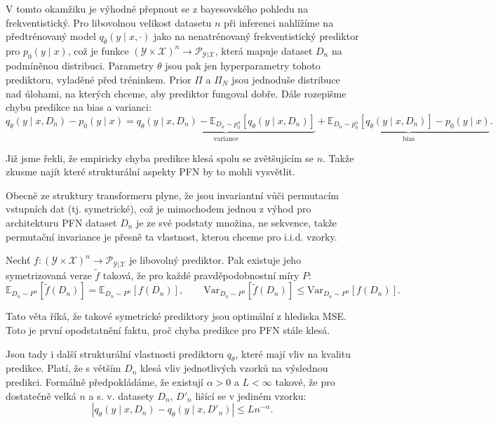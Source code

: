 V tomto okamžiku je výhodné přepnout se z bayesovského pohledu na frekventistický.
Pro libovolnou velikost datasetu $n$ při inferenci nahlížíme na předtrénovaný model $q_{\hat\theta}(y \mid x, \cdot)$ jako na nenatrénovaný frekventistický prediktor pro $p_0(y \mid x)$, což je funkce $(\mathcal{Y} \times \mathcal{X})^n \to \mathcal{P}_{\mathcal{Y}|\mathcal{X}}$, která mapuje dataset $D_n$ na podmíněnou distribuci.
Parametry $\theta$ jsou pak jen hyperparametry tohoto prediktoru, vyladěné před tréninkem. 
Prior $\Pi$ a $\Pi_N$ jsou jednoduše distribuce nad úlohami, na kterých chceme, aby prediktor fungoval dobře.
Dále rozepišme chybu predikce na bias a varianci:
\begin{equation}
    q_\theta(y \mid x, D_n) - p_0(y \mid x) = \underbrace{q_\theta(y \mid x, D_n) - \mathbb{E}_{D_n \sim p_0^n}[q_\theta(y \mid x, D_n)]}_{\text{variance}} + \underbrace{\mathbb{E}_{D_n \sim p_0^n}[q_\theta(y \mid x, D_n)] - p_0(y \mid x)}_{\text{bias}}.
\label{Bias_Variance}
\end{equation}

Již jsme řekli, že empiricky chyba predikce klesá spolu se zvětšujícím se $n$.
Takže zkusme najít které strukturální aspekty PFN by to mohli vysvětlit.
\par 

Obecně ze struktury transformeru plyne, že jsou invariantní vůči permutacím vstupních dat (tj. symetrické), což je mimochodem jednou z výhod pro architekturu PFN dataset $D_n$ je ze své podstaty množina, ne sekvence, takže permutační invariance je přesně ta vlastnost, kterou chceme pro i.i.d. vzorky.
\begin{theorem}
    Nechť $f : (\mathcal{Y} \times \mathcal{X})^n \to \mathcal{P}_{\mathcal{Y}|\mathcal{X}}$ je libovolný prediktor. Pak existuje jeho symetrizovaná verze $\tilde{f}$ taková, že pro každé pravděpodobnostní míry $P$:
\begin{equation}
    \mathbb{E}_{D_n \sim P^n}[\tilde{f}(D_n)] = \mathbb{E}_{D_n \sim P^n}[f(D_n)], \qquad \mathrm{Var}_{D_n \sim P^n}[\tilde{f}(D_n)] \leq \mathrm{Var}_{D_n \sim P^n}[f(D_n)].
\end{equation}
\label{theorem:symetrie_transformeru}
\end{theorem}
Tato věta říká, že takové symetrické prediktory jsou optimální z hlediska MSE.
Toto je první opodstatnění faktu, proč chyba predikce pro PFN stále klesá.
\par   

Jsou tady i další strukturální vlastnosti prediktoru $q_{\theta}$, které mají vliv na kvalitu predikce.
Platí, že s větším $D_n$ klesá vliv jednotlivých vzorků na výslednou predikci. 
Formálně předpokládáme, že existují $\alpha > 0$ a $L < \infty$ takové, že pro dostatečně velká $n$ a s. v. datasety $D_n$, $D'_n$ lišící se v jediném vzorku:
\begin{equation}
    \left| q_\theta(y \mid x, D_n) - q_\theta(y \mid x, D'_n) \right| \leq L n^{-\alpha}.
\label{eq:horní_mez_prediktoru}
\end{equation}


